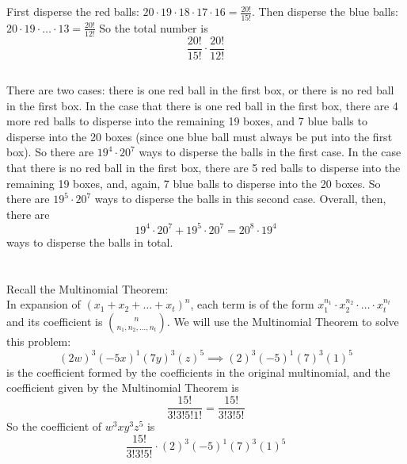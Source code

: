 \documentclass{article}
\begin{document}
\subsection{}
	First disperse the red balls: $20\cdot19\cdot18\cdot17\cdot16=\frac{20!}{15!}$. Then disperse
	the blue balls: $20\cdot19\cdot\ldots\cdot13=\frac{20!}{12!}$
	So the total number is
	\[\frac{20!}{15!}\cdot\frac{20!}{12!}\]
\subsection{}
	There are two cases: there is one red ball in the first box, or there is no red ball in the
	first box.
	\newline
	\newline
	In the case that there is one red ball in the first box, there are 4 more red balls
	to disperse into the remaining 19 boxes, and 7 blue balls to disperse into the 20 boxes (since
	one blue ball must always be put into the first box). So there are $19^4\cdot20^7$ ways to
	disperse the balls in the first case.
	\newline
	\newline
	In the case that there is no red ball in the first box, there are 5 red balls to disperse into
	the remaining 19 boxes, and, again, 7 blue balls to disperse into the 20 boxes. So there are
	$19^5\cdot20^7$ ways to disperse the balls in this second case.
	\newline
	\newline
	Overall, then, there are
	\[19^4\cdot20^7+19^5\cdot20^7=20^8\cdot19^4\]
	ways to disperse the balls in total.
\section{} %
	Recall the Multinomial Theorem:\\
	In expansion of $(x_1+x_2+\ldots+x_t)^n$, each term is of the form
	$x_1^{n_1}\cdot{x_2^{n_2}}\cdot\ldots\cdot{x_t^{n_t}}$ and its coefficient is
	$n\choose{n_1,n_2,\ldots,n_t}$.
	\newline
	\newline
	We will use the Multinomial Theorem to solve this problem:
	\[(2w)^3(-5x)^1(7y)^3(z)^5\implies(2)^3(-5)^1(7)^3(1)^5\]
	is the coefficient formed by the coefficients in the original multinomial,
	and the coefficient given by the Multinomial Theorem is
	\[\frac{15!}{3!3!5!1!}=\frac{15!}{3!3!5!}\]
	So the coefficient of $w^3xy^3z^5$ is
	\[\frac{15!}{3!3!5!}\cdot(2)^3(-5)^1(7)^3(1)^5\]
\end{document}
